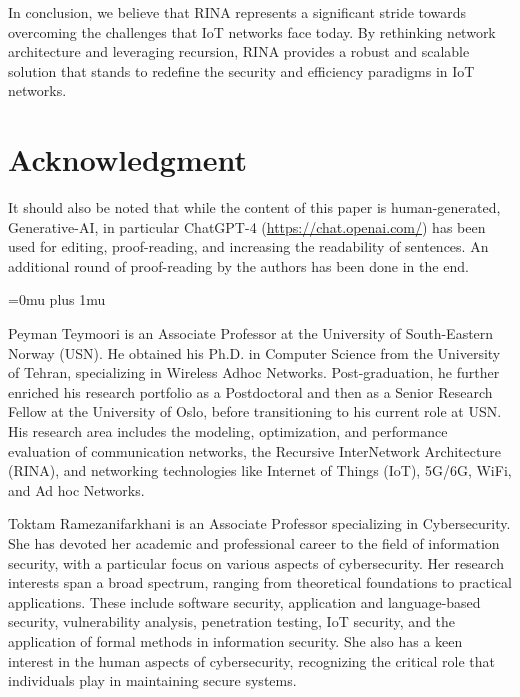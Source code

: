 \documentclass{ieeeaccess}
\begin{document}
In conclusion, we believe that RINA represents a significant stride towards overcoming the challenges that IoT networks face today. By rethinking network architecture and leveraging recursion, RINA provides a robust and scalable solution that stands to redefine the security and efficiency paradigms in IoT networks.

\section*{Acknowledgment}
It should also be noted that while the content of this paper is human-generated, Generative-AI, in particular ChatGPT-4 (\underline{https://chat.openai.com/}) has been used for editing, proof-reading, and increasing the readability of sentences. An additional round of proof-reading by the authors has been done in the end.

\Urlmuskip=0mu plus 1mu\relax





\begin{IEEEbiography}{Peyman Teymoori} is an Associate Professor at the University of South-Eastern Norway (USN). He obtained his Ph.D. in Computer Science from the University of Tehran, specializing in Wireless Adhoc Networks. Post-graduation, he further enriched his research portfolio as a Postdoctoral and then as a Senior Research Fellow at the University of Oslo, before transitioning to his current role at USN. His research area includes the modeling, optimization, and performance evaluation of communication networks, the Recursive InterNetwork Architecture (RINA), and networking technologies like Internet of Things (IoT), 5G/6G, WiFi, and Ad hoc Networks.
\end{IEEEbiography}

\begin{IEEEbiography}{Toktam Ramezanifarkhani}  is an Associate Professor specializing in Cybersecurity. She has devoted her academic and professional career to the field of information security, with a particular focus on various aspects of cybersecurity. Her research interests span a broad spectrum, ranging from theoretical foundations to practical applications. These include software security, application and language-based security, vulnerability analysis, penetration testing, IoT security, and the application of formal methods in information security. She also has a keen interest in the human aspects of cybersecurity, recognizing the critical role that individuals play in maintaining secure systems.
\end{IEEEbiography}
\balance

\EOD
\end{document}
